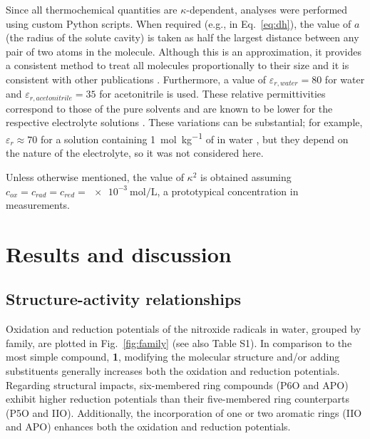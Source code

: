 \documentclass[review,preprint]{elsarticle}
\begin{document}
Since all thermochemical quantities are $\kappa$-dependent, analyses were performed using custom Python scripts. When required (e.g., in Eq.~\eqref{eq:dh}), the value of $a$ (the radius of the solute cavity) is taken as half the largest distance between any pair of two atoms in the molecule. Although this is an approximation, it provides a consistent method to treat all molecules proportionally to their size and it is consistent with other publications \cite{matsuiDensityFunctionalTheory2013}.  Furthermore, a value of $\varepsilon_{r,water}=80$ for water and $\varepsilon_{r,acetonitrile}=35$ for acetonitrile is used. These relative permittivities correspond to those of the pure solvents and are known to be lower for the respective electrolyte solutions \cite{silvaTrueHuckelEquation2022}. These variations can be substantial; for example, $\varepsilon_r \approx 70$ for a solution containing \SI{1}{\mol\per\kilo\gram} of  in water \cite{kontogeorgisDebyeHuckelTheoryIts2018, silvaTrueHuckelEquation2022}, but they depend on the nature of the electrolyte, so it was not considered here.


Unless otherwise mentioned, the value of $\kappa^2$ is obtained assuming  $c_{ox} = c_{rad} = c_ {red} = \SI{e-3}{\mole\per\liter}$, a prototypical concentration in measurements.


\section{Results and discussion} \label{sec:results}

\subsection{Structure-activity relationships} \label{sec:sar}

Oxidation and reduction potentials of the nitroxide radicals in water, grouped by family, are plotted in Fig.~\ref{fig:family} (see also Table S1). In comparison to the most simple compound, \textbf{1}, modifying the molecular structure and/or adding substituents generally increases both the oxidation and reduction potentials. Regarding structural impacts, six-membered ring compounds (P6O and APO) exhibit higher reduction potentials than their five-membered ring counterparts (P5O and IIO). Additionally, the incorporation of one or two aromatic rings (IIO and APO) enhances both the oxidation and reduction potentials.
\end{document}
